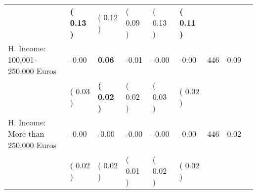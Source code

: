 \begin{tabular}{L{6.2cm} C{1.8cm} C{1.8cm} C{1.8cm} C{1.8cm} C{1.8cm} C{1.8cm} C{0.3cm} C{0.3cm}}
 & \textbf{(     0.13 )} & (     0.12 ) & (     0.09 ) & (     0.13 ) & \textbf{(     0.11 )}  & \\
H. Income: 100,001-250,000 Euros &     -0.00 & \textbf{     0.06} &     -0.01 &     -0.00 &     -0.00  & 446 &       0.09 \\ 
 & (     0.03 ) & \textbf{(     0.02 )} & (     0.02 ) & (     0.03 ) & (     0.02 )  & \\
H. Income: More than 250,000 Euros &     -0.00 &     -0.00 &     -0.00 &     -0.00 &     -0.00  & 446 &       0.02 \\ 
 & (     0.02 ) & (     0.02 ) & (     0.01 ) & (     0.02 ) & (     0.02 )  & \\
\bottomrule
\end{tabular}
